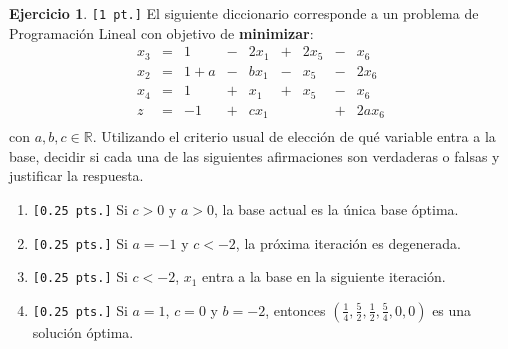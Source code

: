 \documentclass[a4paper,oneside,11pt]{amsart}
\theoremstyle{definition}
\newtheorem{quest}{Ejercicio}
\begin{document}


\begin{quest} \verb|[1 pt.]| El siguiente diccionario corresponde a un problema de Programación Lineal con objetivo de \textbf{minimizar}:
    \[
    \begin{array}{rrrrrrrrr}
        x_3 & = & 1   & - & 2x_1 & + & 2x_5 & - & x_6   \\
        x_2 & = & 1+a & - & bx_1 & - &  x_5 & - & 2x_6  \\
        x_4 & = & 1   & + & x_1  & + & x_5 & - & x_6   \\ \hline
        z   & = & -1  & + & cx_1 &   &      & + & 2ax_6  \\
    \end{array}
    \]
    con $a,b,c\in\mathbb{R}$. Utilizando el criterio usual de elección de qué variable entra a la base, decidir si cada una de las siguientes afirmaciones son verdaderas o falsas y justificar la respuesta.
    \begin{enumerate}[label=\alph*)]
    \item \verb|[0.25 pts.]| Si $c> 0$ y $a> 0$, la base actual es la única base óptima.
    \item \verb|[0.25 pts.]| Si $a=-1$ y $c< -2$, la próxima iteración es degenerada.
    \item \verb|[0.25 pts.]| Si $c < -2$, $x_1$ entra a la base en la siguiente iteración.
    \item \verb|[0.25 pts.]| Si $a=1$, $c=0$ y $b=-2$, entonces $(\frac{1}{4}, \frac{5}{2}, \frac{1}{2},\frac{5}{4}, 0, 0)$ es una solución óptima.  
    \end{enumerate}

\end{quest}

\end{document}
